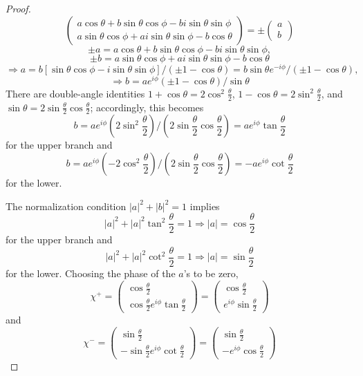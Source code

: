 \documentclass{article}
\begin{document}
\begin{proof}
\[    \begin{pmatrix}
      a\cos\theta + b\sin\theta\cos\phi - bi\sin\theta\sin\phi \\
      a\sin\theta\cos\phi + ai\sin\theta\sin\phi -b\cos\theta
    \end{pmatrix}
    = \pm
    \begin{pmatrix}
      a \\
      b
    \end{pmatrix}
  \]
  \[
    \pm a = a\cos\theta+b\sin\theta\cos\phi - bi\sin\theta\sin\phi,
  \]
  \[
    \pm b = a\sin\theta\cos\phi + ai\sin\theta\sin\phi - b\cos\theta
  \]
  \[
    \Rightarrow a = b[\sin\theta\cos\phi -i\sin\theta\sin\phi] / (\pm 1 - \cos\theta) = b\sin\theta e^{-i\phi} / (\pm 1 - \cos\theta),
  \]
  \[
    \Rightarrow b = ae^{i\phi}(\pm 1 - \cos\theta) / \sin\theta
  \]
  There are double-angle identities $1 + \cos\theta = 2\cos^{2}\frac{\theta}{2}$, $1 - \cos\theta = 2\sin^{2}\frac{\theta}{2}$,
  and $\sin\theta = 2\sin\frac{\theta}{2}\cos\frac{\theta}{2}$; accordingly, this becomes
  \[
    b = ae^{i\phi}(2\sin^{2}\frac{\theta}{2}) / (2\sin\frac{\theta}{2}\cos\frac{\theta}{2}) = ae^{i\phi}\tan\frac{\theta}{2}
  \]
  for the upper branch and
  \[
    b = ae^{i\phi}(-2\cos^{2}\frac{\theta}{2}) / (2\sin\frac{\theta}{2}\cos\frac{\theta}{2}) = -ae^{i\phi}\cot\frac{\theta}{2}
  \]
  for the lower.

  The normalization condition $|a|^{2} + |b|^{2} = 1$ implies
  \[
    |a|^{2} + |a|^{2}\tan^{2}\frac{\theta}{2} = 1 \Rightarrow |a| = \cos\frac{\theta}{2}
  \]
  for the upper branch and
  \[
    |a|^{2} + |a|^{2}\cot^{2}\frac{\theta}{2} = 1 \Rightarrow |a| = \sin\frac{\theta}{2}
  \]
  for the lower.
  Choosing the phase of the $a$'s to be zero,
  \[
    \chi^{+} =
    \begin{pmatrix}
      \cos\frac{\theta}{2} \\
      \cos\frac{\theta}{2}e^{i\phi}\tan\frac{\theta}{2}
    \end{pmatrix}
    =
    \begin{pmatrix}
      \cos\frac{\theta}{2} \\
      e^{i\phi}\sin\frac{\theta}{2}
    \end{pmatrix}
  \]
  and
  \[
    \chi^{-} =
    \begin{pmatrix}
      \sin\frac{\theta}{2} \\
      -\sin\frac{\theta}{2}e^{i\phi}\cot\frac{\theta}{2}
    \end{pmatrix}
    =
    \begin{pmatrix}
      \sin\frac{\theta}{2} \\
      -e^{i\phi}\cos\frac{\theta}{2}
    \end{pmatrix}
  \]
\end{proof}
\end{document}
